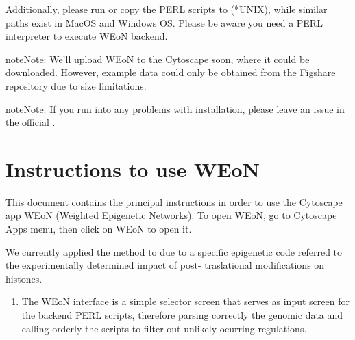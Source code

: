 \documentclass[letterpaper,10pt,english]{sphinxmanual}
\begin{document}
Additionally, please run  or copy the PERL scripts to
(*UNIX), while similar paths exist in MacOS and Windows OS.
Please be aware you need a PERL interpreter to execute WEoN backend.

\begin{sphinxadmonition}{note}{Note:}
 We’ll upload WEoN to the Cytoscape
 soon, where it could be downloaded. However,
example data could only be obtained from the Figshare repository due to size limitations.
\end{sphinxadmonition}

\begin{sphinxadmonition}{note}{Note:}
If you run into any problems with installation, please leave an issue in the
official .
\end{sphinxadmonition}


\chapter{Instructions to use WEoN}
\label{\detokenize{use_instructions:instructions-to-use-weon}}\label{\detokenize{use_instructions::doc}}
This document contains the principal instructions in order to use the Cytoscape
app WEoN (Weighted Epigenetic Networks). To open WEoN, go to Cytoscape Apps menu,
then click on WEoN to open it.

We currently applied the method to  due to a specific
epigenetic code referred to the experimentally determined impact of post-
traslational modifications on histones.
\begin{enumerate}
\def\theenumi{\arabic{enumi}}
\def\labelenumi{\theenumi .}
\makeatletter\def\p@enumii{\p@enumi \theenumi .}\makeatother
\item {} 

The WEoN interface is a simple selector screen that serves as input screen for
the backend PERL scripts, therefore parsing correctly the genomic data and
calling orderly the scripts to filter out unlikely ocurring regulations.

\end{enumerate}
\end{document}
